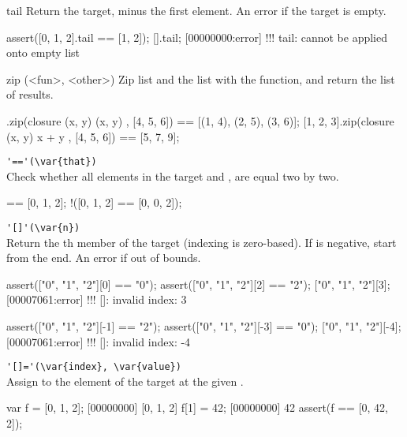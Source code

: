 \begin{urbiscriptapi}
\item[tail]
  Return the target, minus the first element. An error if the target
  is empty.

\begin{urbiscript}
assert([0, 1, 2].tail == [1, 2]);
[].tail;
[00000000:error] !!! tail: cannot be applied onto empty list
\end{urbiscript}

\item[zip](<fun>, <other>)
  Zip \this list and the  list with the  function, and
  return the list of results.

\begin{urbiassert}
[1, 2, 3].zip(closure (x, y) { (x, y) }, [4, 5, 6])
       == [(1, 4), (2, 5), (3, 6)];
[1, 2, 3].zip(closure (x, y) { x + y }, [4, 5, 6])
       == [5, 7, 9];
\end{urbiassert}

\item \lstinline|'=='(\var{that})|\\
Check whether all elements in the target and , are
equal two by two.

\begin{urbiassert}
[0, 1, 2] == [0, 1, 2];
!([0, 1, 2] == [0, 0, 2]);
\end{urbiassert}

\item \lstinline|'[]'(\var{n})|\\
  Return the th member of the target (indexing is
  zero-based). If  is negative, start from the end.  An error
  if out of bounds.

\begin{urbiscript}
assert(["0", "1", "2"][0] == "0");
assert(["0", "1", "2"][2] == "2");
["0", "1", "2"][3];
[00007061:error] !!! []: invalid index: 3

assert(["0", "1", "2"][-1] == "2");
assert(["0", "1", "2"][-3] == "0");
["0", "1", "2"][-4];
[00007061:error] !!! []: invalid index: -4
\end{urbiscript}

\item \lstinline|'[]='(\var{index}, \var{value})|\\
  Assign  to the element of the target at the given
  .

\begin{urbiscript}
var f = [0, 1, 2];
[00000000] [0, 1, 2]
f[1] = 42;
[00000000] 42
assert(f == [0, 42, 2]);
\end{urbiscript}


\end{urbiscriptapi}
